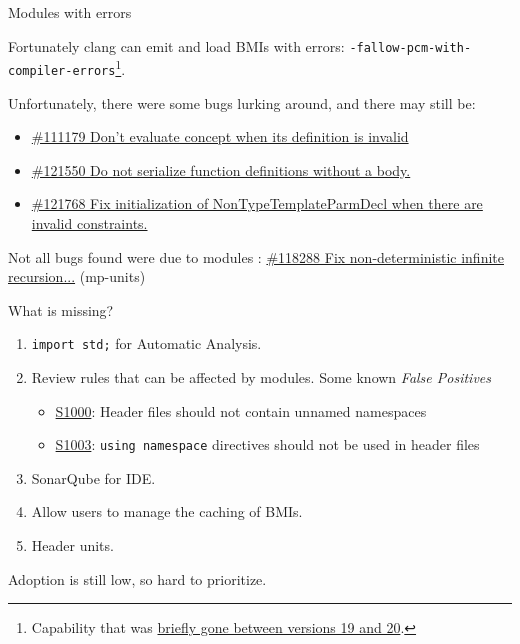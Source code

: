 \documentclass[aspectratio=169]{beamer}
\begin{document}
\begin{frame}[t]{Modules with errors}
  \begin{block}{}
    \small Fortunately clang can emit and load BMIs with errors: \texttt{-fallow-pcm-with-compiler-errors}\footnote{Capability that was \href{https://github.com/llvm/llvm-project/pull/121485}{briefly gone between versions 19 and 20}.}.

    \vspace{0.5em}

    Unfortunately, there were some bugs lurking around, and there may still be:
    \begin{itemize}
      \item \href{https://github.com/llvm/llvm-project/pull/111179}{\#111179 Don't evaluate concept when its definition is invalid}
      \item \href{https://github.com/llvm/llvm-project/pull/121550}{\#121550 Do not serialize function definitions without a body.}
      \item \href{https://github.com/llvm/llvm-project/pull/121768}{\#121768 Fix initialization of NonTypeTemplateParmDecl when there are invalid constraints.}
    \end{itemize}
  \end{block}
  \begin{block}{}
    \small Not all bugs found were due to modules :
    \href{https://github.com/llvm/llvm-project/pull/118288}{\#118288 Fix non-deterministic infinite recursion...} (mp-units)
  \end{block}
\end{frame}

\begin{frame}{What is missing?}
  \begin{block}{}
    \begin{enumerate}
      \item \texttt{import std;} for Automatic Analysis.
      \item Review rules that can be affected by modules. Some known \emph{False Positives}
            \begin{itemize}
              \item \href{https://sonarsource.github.io/rspec/\#/rspec/S1000/cfamily}{S1000}: Header files should not contain unnamed namespaces
              \item \href{https://sonarsource.github.io/rspec/\#/rspec/S1003/cfamily}{S1003}: \texttt{using namespace} directives should not be used in header files
            \end{itemize}
      \item SonarQube for IDE.
      \item Allow users to manage the caching of BMIs.
      \item Header units.
    \end{enumerate}
    Adoption is still low, so hard to prioritize.
  \end{block}
\end{frame}
\end{document}
